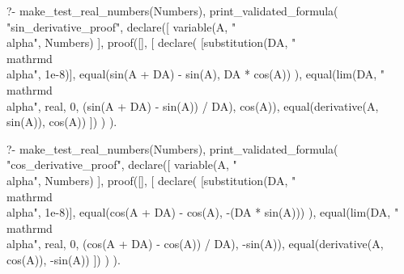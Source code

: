 \begin{prolog}
?-	make_test_real_numbers(Numbers),
	print_validated_formula(
		"sin_derivative_proof",
		declare([
			variable(A, "\\alpha", Numbers) 
		],
			proof([],
			[
				declare(
					[substitution(DA, "\\mathrm{d}\\alpha", 1e-8)],
					equal(sin(A + DA) - sin(A), DA * cos(A))
				),
				equal(lim(DA, "\\mathrm{d}\\alpha", real, 0, (sin(A + DA) - sin(A)) / DA), cos(A)),
				equal(derivative(A, sin(A)), cos(A))
			])
		)
	).
\end{prolog}

\begin{prolog}
?-	make_test_real_numbers(Numbers),
	print_validated_formula(
		"cos_derivative_proof",
		declare([
			variable(A, "\\alpha", Numbers) 
		],
			proof([],
			[
				declare(
					[substitution(DA, "\\mathrm{d}\\alpha", 1e-8)],
					equal(cos(A + DA) - cos(A), -(DA * sin(A)))
				),
				equal(lim(DA, "\\mathrm{d}\\alpha", real, 0, (cos(A + DA) - cos(A)) / DA), -sin(A)),
				equal(derivative(A, cos(A)), -sin(A))
			])
		)
	).
\end{prolog}

